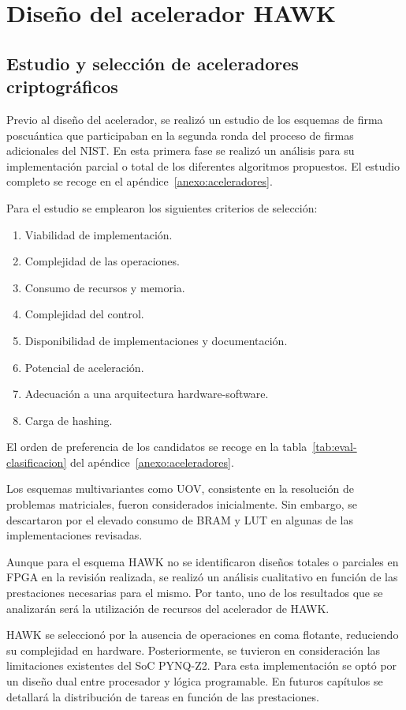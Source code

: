 \chapter{Diseño del acelerador HAWK}
\label{ch:design}

\section{Estudio y selección de aceleradores criptográficos}
Previo al diseño del acelerador, se realizó un estudio 
de los esquemas de firma poscuántica que participaban en la segunda
ronda del proceso de firmas adicionales del NIST. 
En esta primera fase se realizó un análisis para su 
implementación parcial o total de los diferentes 
algoritmos propuestos.
El estudio completo se recoge en el apéndice~\ref{anexo:aceleradores}.


Para el estudio se emplearon los siguientes criterios de selección:
\begin{enumerate}
    \item Viabilidad de implementación.
    \item Complejidad de las operaciones.
    \item Consumo de recursos y memoria.
    \item Complejidad del control.
    \item Disponibilidad de implementaciones y documentación.
    \item Potencial de aceleración.
    \item Adecuación a una arquitectura hardware-software.
    \item Carga de hashing.
\end{enumerate}


El orden de preferencia de los candidatos se recoge en la
tabla~\ref{tab:eval-clasificacion} del
apéndice~\ref{anexo:aceleradores}.

Los esquemas multivariantes como UOV, consistente en la resolución de problemas matriciales,
fueron considerados inicialmente. 
Sin embargo, se descartaron por el elevado consumo de BRAM y LUT en algunas de las implementaciones revisadas.

Aunque para el esquema HAWK no se identificaron diseños totales o parciales en FPGA en la revisión realizada, 
se realizó un análisis cualitativo en función de las prestaciones necesarias para el mismo. 
Por tanto, uno de los resultados que se analizarán será la utilización de recursos del acelerador de HAWK.

HAWK se seleccionó por la ausencia de operaciones en coma flotante, reduciendo su complejidad en hardware. 
Posteriormente, se tuvieron en consideración las limitaciones existentes del SoC PYNQ-Z2.
Para esta implementación se optó por un diseño dual entre procesador y lógica programable.
En futuros capítulos se detallará la distribución de tareas en función de las prestaciones.


